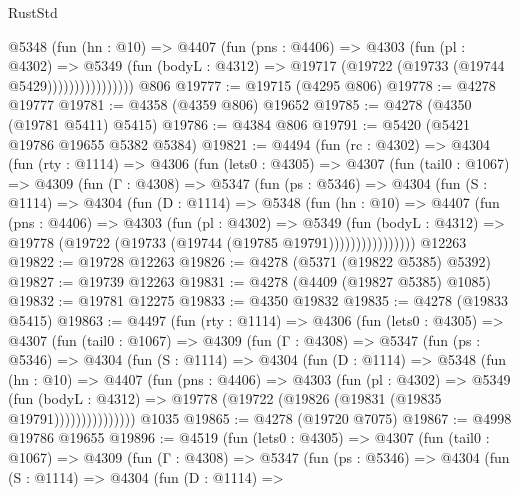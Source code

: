 \begin{lexlean}{RustStd}
\begin{coremodule}
{\begin{coremodule}
{{{{{{{{{{{{{{{{{{{{{{{{{{{{{{{{{{{                    @5348
                      (fun (hn : @10) =>
                      @4407
                        (fun (pns : @4406) =>
                        @4303
                          (fun (pl : @4302) =>
                          @5349
                            (fun (bodyL : @4312) =>
                            @19717 (@19722 (@19733 (@19744 @5429))))))))))))))))
    @806
@19777 := @19715 (@4295 @806)
@19778 := @4278 @19777
@19781 := @4358 (@4359 @806) @19652
@19785 := @4278 (@4350 (@19781 @5411) @5415)
@19786 := @4384 @806
@19791 := @5420 (@5421 @19786 @19655 @5382 @5384)
@19821 := @4494
    (fun (rc : @4302) =>
    @4304
      (fun (rty : @1114) =>
      @4306
        (fun (lets0 : @4305) =>
        @4307
          (fun (tail0 : @1067) =>
          @4309
            (fun (Γ : @4308) =>
            @5347
              (fun (ps : @5346) =>
              @4304
                (fun (S : @1114) =>
                @4304
                  (fun (D : @1114) =>
                  @5348
                    (fun (hn : @10) =>
                    @4407
                      (fun (pns : @4406) =>
                      @4303
                        (fun (pl : @4302) =>
                        @5349
                          (fun (bodyL : @4312) =>
                          @19778 (@19722 (@19733 (@19744 (@19785 @19791))))))))))))))))
    @12263
@19822 := @19728 @12263
@19826 := @4278 (@5371 (@19822 @5385) @5392)
@19827 := @19739 @12263
@19831 := @4278 (@4409 (@19827 @5385) @1085)
@19832 := @19781 @12275
@19833 := @4350 @19832
@19835 := @4278 (@19833 @5415)
@19863 := @4497
    (fun (rty : @1114) =>
    @4306
      (fun (lets0 : @4305) =>
      @4307
        (fun (tail0 : @1067) =>
        @4309
          (fun (Γ : @4308) =>
          @5347
            (fun (ps : @5346) =>
            @4304
              (fun (S : @1114) =>
              @4304
                (fun (D : @1114) =>
                @5348
                  (fun (hn : @10) =>
                  @4407
                    (fun (pns : @4406) =>
                    @4303
                      (fun (pl : @4302) =>
                      @5349
                        (fun (bodyL : @4312) =>
                        @19778 (@19722 (@19826 (@19831 (@19835 @19791)))))))))))))))
    @1035
@19865 := @4278 (@19720 @7075)
@19867 := @4998 @19786 @19655
@19896 := @4519
    (fun (lets0 : @4305) =>
    @4307
      (fun (tail0 : @1067) =>
      @4309
        (fun (Γ : @4308) =>
        @5347
          (fun (ps : @5346) =>
          @4304
            (fun (S : @1114) =>
            @4304
              (fun (D : @1114) =>
}}}}}}}}}}}}}}}}}}}}}}}}}}}}}}}}}}}
\end{coremodule}}
\end{coremodule}
\end{lexlean}
